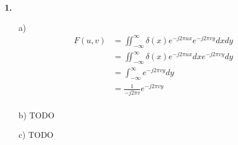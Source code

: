 \documentclass[a4paper,11pt]{article}
\author{\authorinfotitle}
\title{\titleinfo}
\date{\today}
\begin{document}
	\maketitle
	\begin{enumerate}
		\item[\textbf{1.}]
			\begin{enumerate}
				\item[a)]
					\begin{align*}
					F(u,v) &= \iint_{-\infty}^{\infty}\delta(x)e^{-j2\pi ux}e^{-j2\pi vy}dx dy\\
					&=\iint_{-\infty}^{\infty}\delta(x)e^{-j2\pi ux}dx e^{-j2\pi vy}dy\\
					&=\int_{-\infty}^{\infty} e^{-j2\pi vy}dy\\
					&= \frac{1}{-j2\pi v} e^{-j2\pi vy}\\
					\end{align*}
				\item[b)]
					TODO
				\item[c)]
					TODO
			\end{enumerate}
	\end{enumerate}
\end{document}
